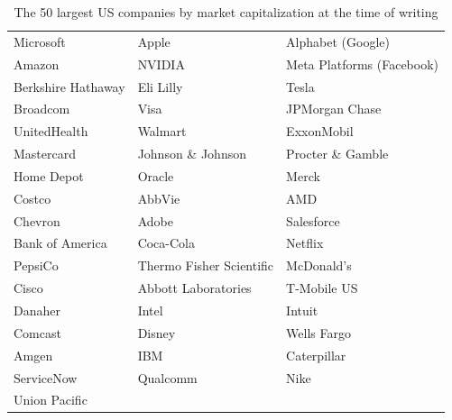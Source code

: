 \begin{table}[H]
    \centering
    \begin{tabular}{|l l l|}
        \hline
        Microsoft & Apple & Alphabet (Google) \\
        Amazon & NVIDIA & Meta Platforms (Facebook) \\
        Berkshire Hathaway & Eli Lilly & Tesla \\
        Broadcom & Visa & JPMorgan Chase \\
        UnitedHealth & Walmart & ExxonMobil \\
        Mastercard & Johnson \& Johnson & Procter \& Gamble \\
        Home Depot & Oracle & Merck \\
        Costco & AbbVie & AMD \\
        Chevron & Adobe & Salesforce \\
        Bank of America & Coca-Cola & Netflix \\
        PepsiCo & Thermo Fisher Scientific & McDonald's \\
        Cisco & Abbott Laboratories & T-Mobile US \\
        Danaher & Intel & Intuit \\
        Comcast & Disney & Wells Fargo \\
        Amgen & IBM & Caterpillar \\
        ServiceNow & Qualcomm & Nike \\
        Union Pacific & & \\
        \hline
    \end{tabular}
    \caption{The 50 largest US companies by market capitalization at the time of writing}
    \label{table:companies}
\end{table}



